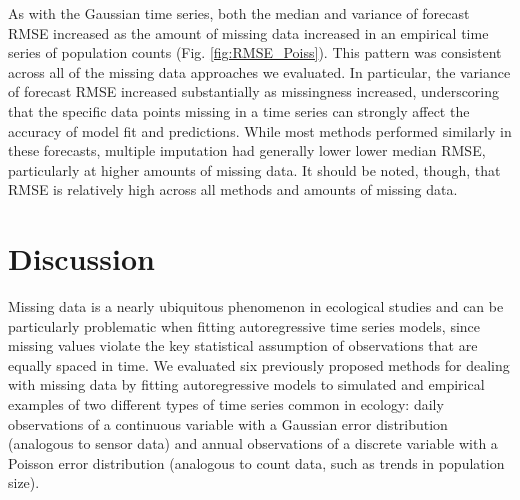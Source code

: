 \documentclass{article}
\begin{document}
As with the Gaussian time series, both the median and variance of forecast RMSE increased as the amount of missing data increased in an empirical time series of population counts (Fig. \ref{fig:RMSE_Poiss}). This pattern was consistent across all of the missing data approaches we evaluated. In particular, the variance of forecast RMSE increased substantially as missingness increased, underscoring that the specific  data points missing in a time series can strongly affect the accuracy of model fit and predictions. While most methods performed similarly in these forecasts, multiple imputation had generally lower lower median RMSE, particularly at higher amounts of missing data. It should be noted, though, that RMSE is relatively high across all methods and amounts of missing data. 

\section*{Discussion}

 Missing data is a nearly ubiquitous phenomenon in ecological studies and can be particularly problematic when fitting autoregressive time series models, since missing values violate the key statistical assumption of observations that are equally spaced in time. We evaluated six previously proposed methods for dealing with missing data by fitting autoregressive models to simulated and empirical examples of two different types of time series common in ecology: daily observations of a continuous variable with a Gaussian error distribution (analogous to sensor data) and annual observations of a discrete variable with a Poisson error distribution (analogous to count data, such as trends in population size). 
 
\end{document}
